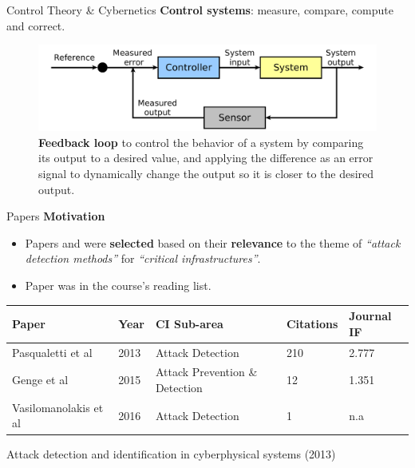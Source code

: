 \documentclass[compress]{beamer}
\begin{document}
\begin{frame}{Control Theory \& Cybernetics}
    \textbf{Control systems}: measure, compare, compute and correct.
    \begin{figure}
    \centering\tiny
    \includegraphics[width=1.0\textwidth]{./images/control-theory.png}
    \caption{\textbf{Feedback loop} to control the behavior of a system by comparing its output to a desired value, and applying the difference as an error signal to dynamically change the output so it is closer to the desired output.}
    \label{fig:control-theory}
    \end{figure}
\end{frame}
\begin{frame}{Papers}
    \textbf{Motivation}
    \begin{itemize}
     \item Papers \cite{pasqualetti2013attack} and \cite{genge2015system} were \textbf{selected} based on their \textbf{relevance} to the theme of \textit{``attack detection methods''} for \textit{``critical infrastructures''}. 
     \item Paper \cite{vasilo2016multi} was in the course's reading list.

    \end{itemize}
    \begin{table}\tiny
	\begin{tabular}{|l|l|l|l|l|}
	\hline
	\textbf{Paper} & \textbf{Year} & \textbf{CI Sub-area} & \textbf{Citations} & \textbf{Journal IF}\\ 
	\hline \hline
	Pasqualetti et al \cite{pasqualetti2013attack} & 2013 & Attack Detection & 210 & 2.777\\
	Genge et al \cite{genge2015system} & 2015 & Attack Prevention \& Detection & 12 & 1.351\\
	Vasilomanolakis et al \cite{vasilo2016multi} & 2016 & Attack Detection & 1 & n.a \\
	\hline
	\end{tabular}
    \end{table}
\end{frame}
\begin{frame}{Attack detection and identification in cyberphysical systems
    (2013)}

\end{frame}
\end{document}
